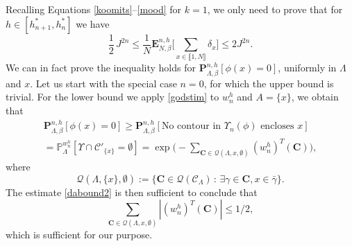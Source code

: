 \documentclass[10pt]{amsart}
\let\mathcal\mathscr
\newcommand{\sep}{\,:\,}
\numberwithin{equation}{section}
\theoremstyle{plain}
\theoremstyle{definition}
\newcommand{\lint}{\llbracket}
\newcommand{\rint}{\rrbracket}
\newcommand{\cQ}{{\ensuremath{\mathcal Q}} }
\newcommand{\cC}{{\ensuremath{\mathcal C}} }
\newcommand{\bP}{{\ensuremath{\mathbf P}} }
\newcommand{\bE}{{\ensuremath{\mathbf E}} }
\newcommand{\bC}{{\ensuremath{\mathbf C}} }
\newcommand{\bbP}{{\ensuremath{\mathbb P}} }
\newcommand{\gb}{\beta}
\newcommand{\gL}{\Lambda}
\begin{document}
Recalling Equations \eqref{koomits}--\eqref{mood} for $k=1$, we only need to prove that
for $h\in [h^*_{n+1},h^*_n]$ we have
\begin{equation*}
\frac{1}{2}\, J^{2n}\le \frac{1}{N}\bE^{n,h}_{N,\gb}\biggl[ \sum_{x\in \lint 1, N\rint}\delta_x\biggr]\le 2J^{2n}.
\end{equation*}
We can in fact prove the inequality holds for $\bP^{n,h}_{\gL,\gb}\left[ \phi(x)=0 \right]$, uniformly in $\gL$ and $x$.
Let us start with the special case $n=0$, for which the upper bound is trivial.
For the lower bound we apply \eqref{godstim} to $w^h_n$ and $A=\{x\}$,
we obtain that
\begin{multline*}
\bP^{n,h}_{\gL,\gb}[\phi(x)=0]\ge \bP^{n,h}_{\gL,\gb}[ \text{No contour in } \Upsilon_n(\phi) \text{ encloses } x]\\
=\bbP^{w^h_n}_{\gL}\left[ \Upsilon \cap \cC'_{\{x\}}=\emptyset \right]
=\exp\biggl(-\sum_{\bC\in \cQ(\gL,x,\emptyset)} (w^h_n)^T(\bC)\biggr),
\end{multline*}
where
\begin{equation*}
\cQ(\gL,\{x\},\emptyset):=\{ \bC \in \cQ(\cC_{\gL}) \sep \exists \gamma \in \bC, x\in \bar \gamma\}.
\end{equation*}
The estimate \eqref{dabound2} is then sufficient to conclude that
\begin{equation*}
\sum_{\bC\in \cQ(\gL,x,\emptyset)} |(w^h_n)^T(\bC)|\le 1/2,
\end{equation*}
which is sufficient for our purpose.
\end{document}
